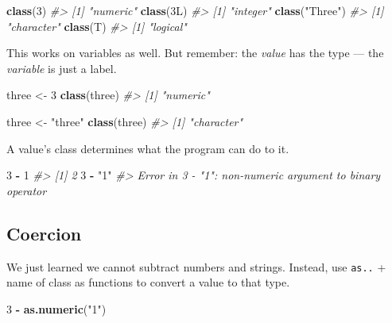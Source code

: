 \documentclass[]{book}
\newenvironment{Shaded}{\begin{snugshade}}{\end{snugshade}}
\newcommand{\KeywordTok}[1]{\textcolor[rgb]{0.13,0.29,0.53}{\textbf{#1}}}
\newcommand{\DecValTok}[1]{\textcolor[rgb]{0.00,0.00,0.81}{#1}}
\newcommand{\StringTok}[1]{\textcolor[rgb]{0.31,0.60,0.02}{#1}}
\newcommand{\CommentTok}[1]{\textcolor[rgb]{0.56,0.35,0.01}{\textit{#1}}}
\newcommand{\OperatorTok}[1]{\textcolor[rgb]{0.81,0.36,0.00}{\textbf{#1}}}
\newcommand{\NormalTok}[1]{#1}
\begin{document}
\begin{Shaded}
\begin{Highlighting}[]
\KeywordTok{class}\NormalTok{(}\DecValTok{3}\NormalTok{)}
\CommentTok{#> [1] "numeric"}
\KeywordTok{class}\NormalTok{(3L)}
\CommentTok{#> [1] "integer"}
\KeywordTok{class}\NormalTok{(}\StringTok{"Three"}\NormalTok{)}
\CommentTok{#> [1] "character"}
\KeywordTok{class}\NormalTok{(T)}
\CommentTok{#> [1] "logical"}
\end{Highlighting}
\end{Shaded}

This works on variables as well. But remember: the \emph{value} has the
type --- the \emph{variable} is just a label.

\begin{Shaded}
\begin{Highlighting}[]
\NormalTok{three <-}\StringTok{ }\DecValTok{3}
\KeywordTok{class}\NormalTok{(three)}
\CommentTok{#> [1] "numeric"}

\NormalTok{three <-}\StringTok{ "three"}
\KeywordTok{class}\NormalTok{(three)}
\CommentTok{#> [1] "character"}
\end{Highlighting}
\end{Shaded}

A value's class determines what the program can do to it.

\begin{Shaded}
\begin{Highlighting}[]
\DecValTok{3} \OperatorTok{-}\StringTok{ }\DecValTok{1}
\CommentTok{#> [1] 2}
\DecValTok{3} \OperatorTok{-}\StringTok{ "1"}
\CommentTok{#> Error in 3 - "1": non-numeric argument to binary operator}
\end{Highlighting}
\end{Shaded}

\subsection{Coercion}\label{coercion}

We just learned we cannot subtract numbers and strings. Instead, use
\texttt{as..} + name of class as functions to convert a value to that
type.

\begin{Shaded}
\begin{Highlighting}[]
\DecValTok{3} \OperatorTok{-}\StringTok{ }\KeywordTok{as.numeric}\NormalTok{(}\StringTok{"1"}\NormalTok{)}
\end{Highlighting}
\end{Shaded}
\end{document}
